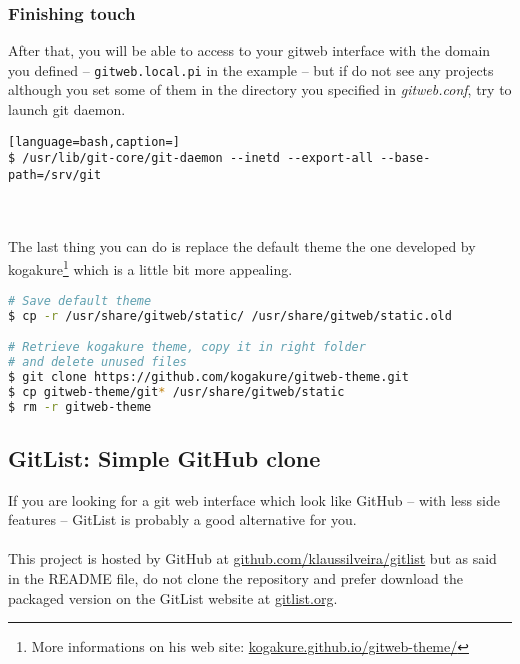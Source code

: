\lstset{language=bash,caption=Gitweb configuration for nginx}


\subsubsection{Finishing touch}
After that, you will be able to access to your gitweb interface with the domain 
you defined -- \texttt{gitweb.local.pi} in the example -- but if do not see any 
projects although you set some of them in the directory you specified in 
\emph{gitweb.conf}, try to launch git daemon.

\begin{lstlisting}[language=bash,caption=]
$ /usr/lib/git-core/git-daemon --inetd --export-all --base-path=/srv/git
\end{lstlisting}

\mbox{}\\\\
The last thing you can do is replace the default theme the one developed by 
kogakure\footnote{More informations on his web site: \href{http://kogakure.github
.io/gitweb-theme/}{kogakure.github.io/gitweb-theme/}} which is a little bit more 
appealing.

\begin{lstlisting}[language=bash,caption=Install kogakure gitweb theme]
# Save default theme
$ cp -r /usr/share/gitweb/static/ /usr/share/gitweb/static.old

# Retrieve kogakure theme, copy it in right folder
# and delete unused files
$ git clone https://github.com/kogakure/gitweb-theme.git
$ cp gitweb-theme/git* /usr/share/gitweb/static
$ rm -r gitweb-theme
\end{lstlisting}

\subsection{GitList: Simple GitHub clone}

If you are looking for a git web interface which look like GitHub -- with less 
side features -- GitList is probably a good alternative for you. 
\\\\
This project is hosted by GitHub at \href{https://github.com/klaussilveira/gitlist}
{github.com/klaussilveira/gitlist} but as said in the README file, do not clone 
the repository and prefer download the packaged version on the GitList website at 
\href{http://gitlist.org}{gitlist.org}.

